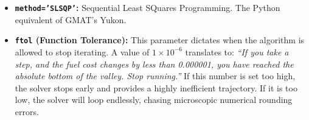 \documentclass[11pt, letterpaper]{article}
\begin{document}
\begin{itemize}
    \item \textbf{\texttt{method='SLSQP'}:} Sequential Least SQuares Programming. The Python equivalent of GMAT's Yukon.
    \item \textbf{\texttt{ftol} (Function Tolerance):} This parameter dictates when the algorithm is allowed to stop iterating. A value of $1 \times 10^{-6}$ translates to: \textit{``If you take a step, and the fuel cost changes by less than 0.000001, you have reached the absolute bottom of the valley. Stop running.''} If this number is set too high, the solver stops early and provides a highly inefficient trajectory. If it is too low, the solver will loop endlessly, chasing microscopic numerical rounding errors.
\end{itemize}
\end{document}
